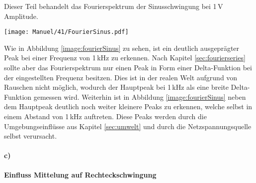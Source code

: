 Dieser Teil behandelt das Fourierspektrum der Sinusschwingung bei 1\,V Amplitude.
\begin{center}
    \texttt{[image: Manuel/41/FourierSinus.pdf]}
    \label{image:fourierSinus}
\end{center}
Wie in Abbildung \ref{image:fourierSinus} zu sehen, ist ein deutlich ausgeprägter Peak bei einer Frequenz von 1\,kHz zu erkennen. Nach Kapitel \ref{sec:fourierseries} sollte aber das Fourierspektrum nur einen Peak in Form einer Delta-Funktion bei der eingestellten Frequenz besitzen. Dies ist in der realen Welt aufgrund von Rauschen nicht möglich, wodurch der Hauptpeak bei 1\,kHz als eine breite Delta-Funktion gemessen wird. Weiterhin ist in Abbildung \ref{image:fourierSinus} neben dem Hauptpeak deutlich noch weiter kleinere Peaks zu erkennen, welche selbst in einem Abstand von 1\,kHz auftreten. Diese Peaks werden durch die Umgebungseinflüsse aus Kapitel \ref{sec:umwelt} und durch die Netzspannungsquelle selbst verursacht.


\newpage
\paragraph{c)}\textbf{Einfluss Mittelung auf Rechteckschwingung}

